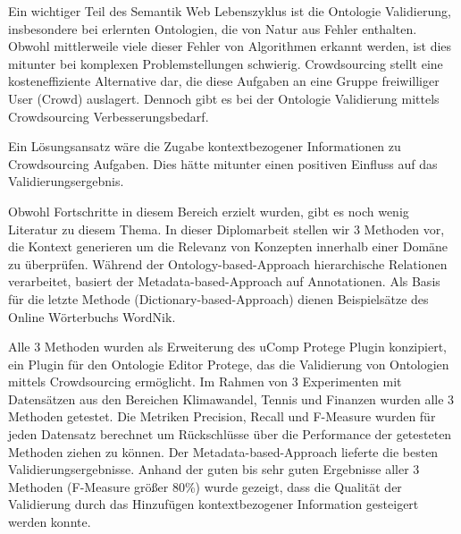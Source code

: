 \begin{kurzfassung}
	Ein wichtiger Teil des Semantik Web Lebenszyklus ist die Ontologie Validierung,
	insbesondere bei erlernten Ontologien, die von Natur aus Fehler enthalten.
	Obwohl mittlerweile viele dieser Fehler von Algorithmen erkannt werden,
	ist dies mitunter bei komplexen Problemstellungen schwierig. Crowdsourcing stellt eine
	kosteneffiziente Alternative dar, die diese Aufgaben an eine Gruppe freiwilliger User (Crowd)
	auslagert. Dennoch gibt es bei der Ontologie Validierung mittels Crowdsourcing Verbesserungsbedarf.

	Ein Lösungsansatz wäre die Zugabe kontextbezogener Informationen zu Crowdsourcing Aufgaben.
	Dies hätte mitunter einen positiven Einfluss auf das Validierungsergebnis.

	Obwohl Fortschritte in diesem Bereich erzielt wurden, gibt es noch wenig Literatur
	zu diesem Thema. In dieser Diplomarbeit stellen wir 3 Methoden vor, die Kontext 
	generieren um die Relevanz von Konzepten innerhalb einer
	Domäne zu überprüfen. Während der Ontology-based-Approach hierarchische
	Relationen verarbeitet, basiert der Metadata-based-Approach auf Annotationen.
	Als Basis für die letzte Methode (Dictionary-based-Approach) dienen Beispielsätze des Online
	Wörterbuchs WordNik.

	Alle 3 Methoden wurden als Erweiterung des uComp Protege Plugin konzipiert, 
	ein Plugin für den Ontologie Editor Protege, das die Validierung von Ontologien mittels Crowdsourcing
	ermöglicht. Im Rahmen von 3 Experimenten mit Datensätzen aus den Bereichen Klimawandel, Tennis und Finanzen
	wurden alle 3 Methoden getestet. Die Metriken Precision, Recall und F-Measure wurden für jeden Datensatz berechnet
	um Rückschlüsse über die Performance der getesteten Methoden ziehen zu können. Der Metadata-based-Approach
	lieferte die besten Validierungsergebnisse. Anhand der guten bis sehr guten Ergebnisse aller 3 Methoden (F-Measure
	größer 80\%) wurde gezeigt, dass die Qualität der Validierung durch das Hinzufügen kontextbezogener Information
	gesteigert werden konnte.

\end{kurzfassung}